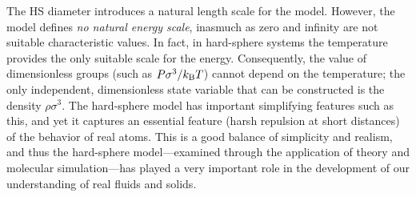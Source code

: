 \documentclass[9pt,bestpractices]{molsim}
\begin{document}
The HS diameter introduces a natural length scale for the model.
However, the model defines \emph{no natural energy scale}, inasmuch as
zero and infinity are not suitable characteristic values. In fact, in
hard-sphere systems the temperature provides the only suitable scale for
the energy. Consequently, the value of dimensionless groups (such as
$P\sigma^3/k_{\rm B}T$) cannot depend on the temperature; the only
independent, dimensionless state variable that can be constructed is the
density $\rho\sigma^3$. The hard-sphere model has important
simplifying features such as this, and yet it captures an essential
feature (harsh repulsion at short distances) of the behavior of real
atoms. This is a good balance of simplicity and realism, and thus the
hard-sphere model---examined through the application of theory and
molecular simulation---has played a very important role in the
development of our understanding of real fluids and solids.


\end{document}
